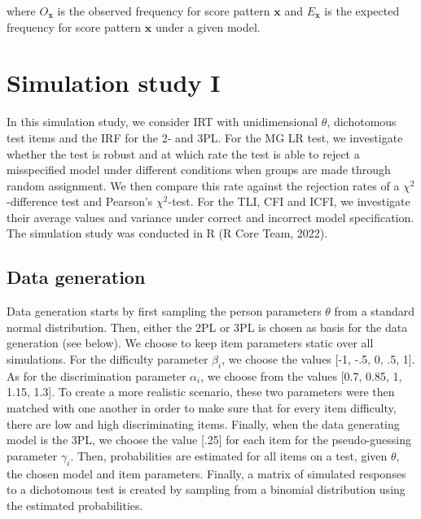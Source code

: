\documentclass[Royal,sageapa,times,doublespace]{sagej}
\begin{document}
where $O_{\boldsymbol{x}}$ is the observed frequency for score pattern $\boldsymbol{x}$ and $E_{\boldsymbol{x}}$ is the expected frequency for score pattern $\boldsymbol{x}$ under a given model. 

\section{Simulation study I}

In this simulation study, we consider IRT with unidimensional $\theta$, dichotomous test items and the IRF for the 2- and 3PL. For the MG LR test, we investigate whether the test is robust and at which rate the test is able to reject a misspecified model under different conditions when groups are made through random assignment. We then compare this rate against the rejection rates of a $\chi^2$-difference test and Pearson's $\chi^2$-test. For the TLI, CFI and ICFI, we investigate their average values and variance under correct and incorrect model specification. The simulation study was conducted in R (R Core Team, 2022).
\subsection{Data generation}
Data generation starts by first sampling the person parameters $\theta$ from a standard normal distribution. Then, either the 2PL or 3PL is chosen as basis for the data generation (see below). We choose to keep item parameters static over all simulations. For the difficulty parameter $\beta_i$, we choose the values [-1, -.5, 0, .5, 1]. As for the discrimination parameter $\alpha_i$, we choose from the values [0.7, 0.85, 1, 1.15, 1.3]. To create a more realistic scenario, these two parameters were then matched with one another in order to make sure that for every item difficulty, there are low and high discriminating items. Finally, when the data generating model is the 3PL, we choose the value [.25] for each item for the pseudo-guessing parameter $\gamma_i$. Then, probabilities are estimated for all items on a test, given $\theta$, the chosen model and item parameters. Finally, a matrix of simulated responses to a dichotomous test is created by sampling from a binomial distribution using the estimated probabilities. 
\end{document}
